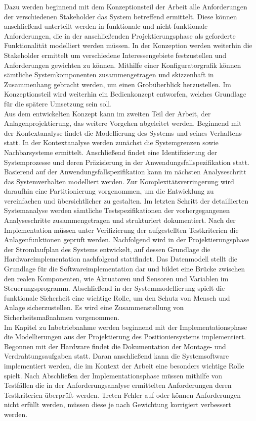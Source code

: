 \documentclass[../../Bachelorarbeit.tex]{subfiles}
\begin{document}
Dazu werden beginnend mit dem Konzeptionsteil der Arbeit alle Anforderungen der verschiedenen Stakeholder das System betreffend ermittelt. Diese können anschließend unterteilt werden in funktionale und nicht-funktionale Anforderungen, die in der anschließenden Projektierungsphase als geforderte Funktionalität modelliert werden müssen. In der Konzeption werden weiterhin die Stakeholder ermittelt um verschiedene Interessengebiete festzustellen und Anforderungen gewichten zu können. Mithilfe einer Konfiguratorgrafik können sämtliche Systemkomponenten zusammengetragen und skizzenhaft in Zusammenhang gebracht werden, um einen Grobüberblick herzustellen. Im Konzeptionsteil wird weiterhin ein Bedienkonzept entworfen, welches Grundlage für die spätere Umsetzung sein soll.\\
Aus dem entwickelten Konzept kann im zweiten Teil der Arbeit, der Anlagenprojektierung, das weitere Vorgehen abgeleitet werden. Beginnend mit der Kontextanalyse findet die Modellierung des Systems und seines Verhaltens statt. In der Kontextanalyse werden zunächst die Systemgrenzen sowie Nachbarsysteme ermittelt. Anschließend findet eine Identifizierung der Systemprozesse und deren Präzisierung in der Anwendungsfallspezifikation statt. Basierend auf der Anwendungsfallspezifikation kann im nächsten Analyseschritt das Systemverhalten modelliert werden. Zur Komplexitätsverringerung wird daraufhin eine Partitionierung vorgenommen, um die Entwicklung zu vereinfachen und übersichtlicher zu gestalten. Im letzten Schritt der detaillierten Systemanalyse werden sämtliche Testspezifikationen der vorhergegangenen Analyseschritte zusammengetragen und strukturiert dokumentiert. Nach der Implementation müssen unter Verifizierung der aufgestellten Testkriterien die Anlagenfunktionen geprüft werden. Nachfolgend wird in der Projektierungsphase der Stromlaufplan des Systems entwickelt, auf dessen Grundlage die Hardwareimplementation nachfolgend stattfindet. Das Datenmodell stellt die Grundlage für die Softwareimplementation dar und bildet eine Brücke zwischen den realen Komponenten, wie Aktuatoren und Sensoren und Variablen im Steuerungsprogramm. Abschließend in der Systemmodellierung spielt die funktionale Sicherheit eine wichtige Rolle, um den Schutz von Mensch und Anlage sicherzustellen. Es wird eine Zusammenstellung von Sicherheitsmaßnahmen vorgenommen.\\
Im Kapitel zu Inbetriebnahme werden beginnend mit der Implementationsphase die Modellierungen aus der Projektierung des Positioniersystems implementiert. Begonnen mit der Hardware findet die Dokumentation der Montage- und Verdrahtungsaufgaben statt. Daran anschließend kann die Systemsoftware implementiert werden, die im Kontext der Arbeit eine besonders wichtige Rolle spielt. Nach Abschließen der Implementationsphase müssen mithilfe von Testfällen die in der Anforderungsanalyse ermittelten Anforderungen \bzw deren Testkriterien überprüft werden. Treten Fehler auf oder können Anforderungen nicht erfüllt werden, müssen diese je nach Gewichtung korrigiert \bzw verbessert werden.\\
\end{document}
